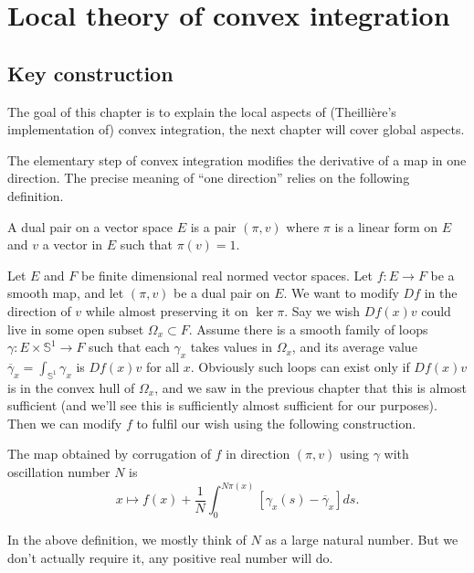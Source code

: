 \documentclass[10pt,a4paper]{article}
\newcounter{chapter}
\newcommand{\co}{\!:}
\newcommand{\uses}[1]{}
\newcommand{\lean}[1]{}
\newcommand{\leanok}{}
\begin{document}
\chapter{Local theory of convex integration}
\label{chap:local}
\section{Key construction}
\label{sec:convex_integration_intro}

The goal of this chapter is to explain the local aspects of
(Theillière's implementation of) convex integration, the next chapter will
cover global aspects.

The elementary step of convex integration modifies the derivative of a
map in one direction. The precise meaning of ``one direction'' relies on the
following definition.

\begin{definition}
  \label{def:dual_pair}
  \leanok
  \lean{DualPair}
  A dual pair on a vector space $E$ is a pair $(π, v)$ where $π$ is a linear
  form on $E$ and $v$ a vector in $E$ such that $π(v) = 1$.
\end{definition}

Let $E$ and $F$ be finite dimensional real normed vector spaces.
Let $f \co E → F$ be a smooth map, and let $(π, v)$ be a dual pair on $E$.
We want to modify $Df$ in the direction of $v$ while almost preserving it
on $\ker π$.
Say we wish $Df(x)v$ could live in some open subset $Ω_x ⊂ F$. Assume there is
a smooth family of loops $γ \co E × 𝕊^1 → F$ such that each
$γ_x$ takes values in $Ω_x$, and its average value $\overline{γ}_x = \int_{𝕊^1}
γ_x$ is $Df(x)v$ for all $x$. Obviously such loops can exist
only if $Df(x)v$ is in the convex hull of $Ω_x$, and we saw in the previous
chapter that this is almost sufficient (and we'll see this is sufficiently
almost sufficient for our purposes). Then we can modify $f$ to fulfil our wish
using the following construction.

\begin{definition}[Theillière 2018]
  \label{def:corrugation}
  \uses{def:loop}
  \leanok
  \lean{corrugation}
  The map obtained by corrugation of $f$ in direction $(π, v)$ using $γ$
  with oscillation number $N$ is
  \[
    x ↦ f(x) + \frac1N  ∫_0^{Nπ(x)} \left[γ_x(s) - \overline{γ}_x\right]ds.
  \]
\end{definition}

In the above definition, we mostly think of $N$ as a large natural
number.
But we don't actually require it, any positive real number will do.
\end{document}
